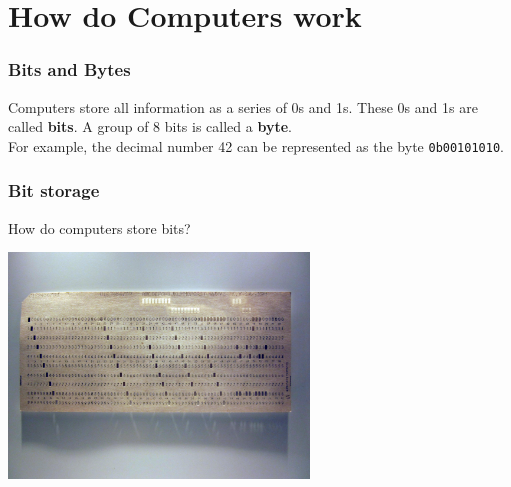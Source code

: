 \documentclass{beamer}
\begin{document}
\section{How do Computers work}
\begin{frame}
  \frametitle{Bits and Bytes}
  Computers store all information as a series of 0s and 1s. These 0s and 1s are called \textbf{bits}. A group of 8 bits is called a \textbf{byte}.\\
  \vspace{0.5cm}
  For example, the decimal number 42 can be represented as the byte \texttt{0b00101010}. 
  \vspace{0.5cm}

\end{frame}
\begin{frame}
  \frametitle{Bit storage}
  How do computers store bits?\\
  \begin{center}
    \includegraphics[width=0.6\textwidth]{fig/punchcard.jpg}
  \end{center}
\end{frame}
\end{document}
